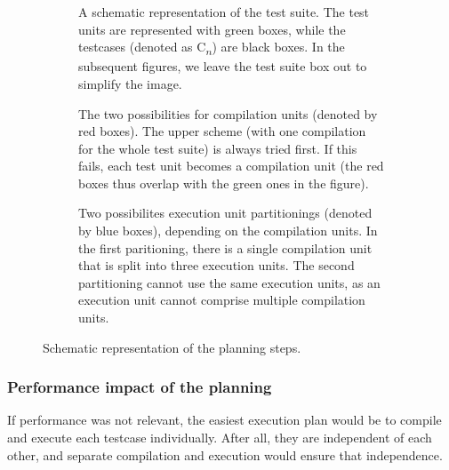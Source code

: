 \documentclass[../main]{subfiles}
\begin{document}
\begin{figure}
    \begin{subfigure}{\textwidth}
        \centering
        
        \caption{
            A schematic representation of the test suite.
            The test units are represented with green boxes, while the testcases (denoted as C\textsubscript{$n$}) are black boxes.
            In the subsequent figures, we leave the test suite box out to simplify the image.
        }
        \label{fig:planning-suite}
    \end{subfigure}
    \par\bigskip
    \begin{subfigure}{\textwidth}
        \centering
        
        \caption{
            The two possibilities for compilation units (denoted by red boxes).
            The upper scheme (with one compilation for the whole test suite) is always tried first.
            If this fails, each test unit becomes a compilation unit (the red boxes thus overlap with the green ones in the figure).
        }
        \label{fig:planning-compilation}
    \end{subfigure}
    \par\bigskip
    \begin{subfigure}{\textwidth}
        \centering
        
        \caption{
            Two possibilites execution unit partitionings (denoted by blue boxes), depending on the compilation units.
            In the first paritioning, there is a single compilation unit that is split into three execution units.
            The second partitioning cannot use the same execution units, as an execution unit cannot comprise multiple compilation units.
        }
        \label{fig:planning-execution}
    \end{subfigure}
    \caption{Schematic representation of the planning steps.}
\end{figure}

\subsubsection{Performance impact of the planning}

If performance was not relevant, the easiest execution plan would be to compile and execute each testcase individually.
After all, they are independent of each other, and separate compilation and execution would ensure that independence.
\end{document}
